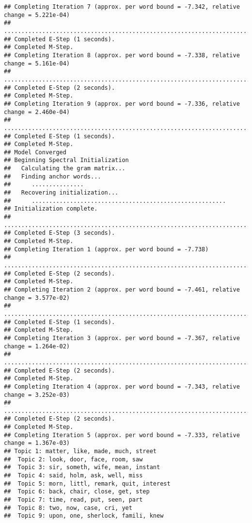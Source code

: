 \documentclass[
]{book}
\begin{document}
\begin{verbatim}
## Completing Iteration 7 (approx. per word bound = -7.342, relative change = 5.221e-04) 
## ....................................................................................................
## Completed E-Step (1 seconds). 
## Completed M-Step. 
## Completing Iteration 8 (approx. per word bound = -7.338, relative change = 5.161e-04) 
## ....................................................................................................
## Completed E-Step (2 seconds). 
## Completed M-Step. 
## Completing Iteration 9 (approx. per word bound = -7.336, relative change = 2.460e-04) 
## ....................................................................................................
## Completed E-Step (1 seconds). 
## Completed M-Step. 
## Model Converged 
## Beginning Spectral Initialization 
##   Calculating the gram matrix...
##   Finding anchor words...
##      ...............
##   Recovering initialization...
##      ........................................................
## Initialization complete.
## ....................................................................................................
## Completed E-Step (3 seconds). 
## Completed M-Step. 
## Completing Iteration 1 (approx. per word bound = -7.738) 
## ....................................................................................................
## Completed E-Step (2 seconds). 
## Completed M-Step. 
## Completing Iteration 2 (approx. per word bound = -7.461, relative change = 3.577e-02) 
## ....................................................................................................
## Completed E-Step (1 seconds). 
## Completed M-Step. 
## Completing Iteration 3 (approx. per word bound = -7.367, relative change = 1.264e-02) 
## ....................................................................................................
## Completed E-Step (2 seconds). 
## Completed M-Step. 
## Completing Iteration 4 (approx. per word bound = -7.343, relative change = 3.252e-03) 
## ....................................................................................................
## Completed E-Step (2 seconds). 
## Completed M-Step. 
## Completing Iteration 5 (approx. per word bound = -7.333, relative change = 1.367e-03) 
## Topic 1: matter, like, made, much, street 
##  Topic 2: look, door, face, room, saw 
##  Topic 3: sir, someth, wife, mean, instant 
##  Topic 4: said, holm, ask, well, miss 
##  Topic 5: morn, littl, remark, quit, interest 
##  Topic 6: back, chair, close, get, step 
##  Topic 7: time, read, put, seen, part 
##  Topic 8: two, now, case, cri, yet 
##  Topic 9: upon, one, sherlock, famili, knew 

\end{verbatim}
\end{document}
